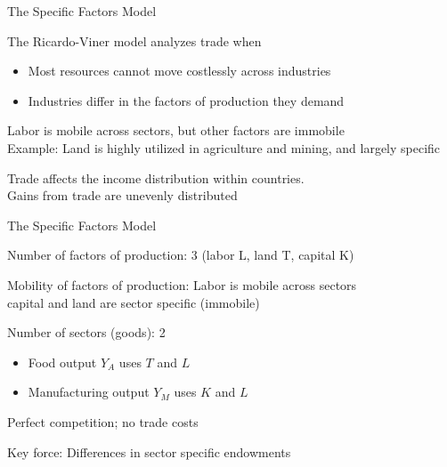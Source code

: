 \documentclass[notes,11pt, aspectratio=169, xcolor=table]{beamer}
\newenvironment{wideitemize}{\itemize\addtolength{\itemsep}{10pt}}{\enditemize}
\begin{document}
\begin{frame}{The Specific Factors Model}
    \begin{wideitemize}
        \item The Ricardo-Viner model analyzes trade when
        \begin{itemize}
            \item Most resources cannot move costlessly across industries
            \item Industries differ in the factors of production they demand
        \end{itemize}

    \item Labor is mobile across sectors, but other factors are immobile \\
    Example: Land is highly utilized in agriculture and mining, and largely specific

    \item Trade affects the income distribution within countries.\\
    Gains from trade are unevenly distributed
    \end{wideitemize}    
\end{frame}


\begin{frame}{The Specific Factors Model}
    \begin{wideitemize}
        \item Number of factors of production: 3 (labor L, land T, capital K)
        
    \item Mobility of factors of production: Labor is mobile across sectors \\
    capital and land are sector specific (immobile)

    \item Number of sectors (goods): 2 
    \begin{itemize}
        \item Food output $Y_A$ uses $T$ and $L$
        \item Manufacturing output $Y_M$ uses $K$ and $L$
    \end{itemize}

    \item Perfect competition; no trade costs

    \item Key force: Differences in sector specific endowments
    \end{wideitemize}    
\end{frame}
\end{document}
